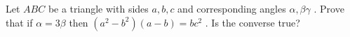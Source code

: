 Let $ABC$ be a triangle with sides $a,b,c$ and corresponding angles $\alpha,\beta\gamma$ . Prove that if $\alpha = 3\beta$  then $(a^2 -b^2)(a-b) = bc^2$ . Is the converse true?